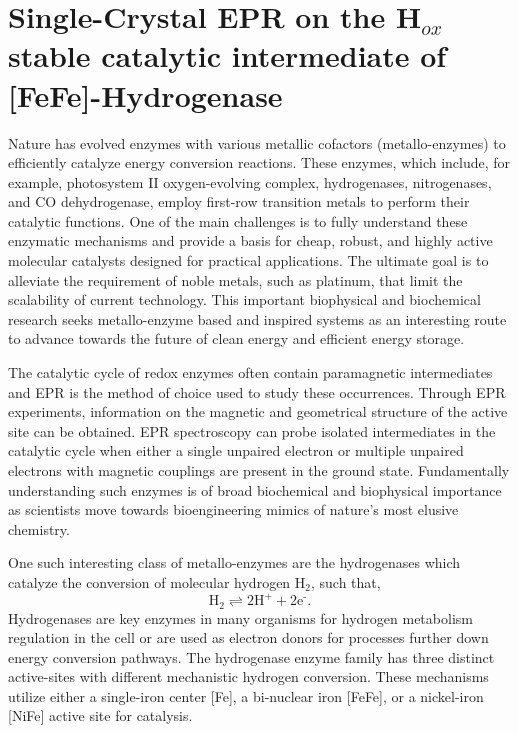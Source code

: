 \chapter[Single-Crystal EPR on FeFe-Hydrogenase]{Single-Crystal EPR on the H$_{ox}$ stable catalytic intermediate of [FeFe]-Hydrogenase}

Nature has evolved enzymes with various metallic cofactors (metallo-enzymes) to efficiently catalyze energy conversion reactions. These enzymes, which include, for example, photosystem II oxygen-evolving complex\cite{CoxOEC}, hydrogenases\cite{lubitzhyd}, nitrogenases\cite{Hoffman2014rev}, and CO dehydrogenase\cite{C5CS00182J}, employ first-row transition metals to perform their catalytic functions. One of the main challenges is to fully understand these enzymatic mechanisms and provide a basis for cheap, robust, and highly active molecular catalysts designed for practical applications. \cite{Lewis15729} The ultimate goal is to alleviate the requirement of noble metals, such as platinum, that limit the scalability of current technology. This important biophysical and biochemical research seeks metallo-enzyme based and inspired systems as an interesting route to advance towards the future of clean energy and efficient energy storage. \cite{schlogl2012chemical}

The catalytic cycle of redox enzymes often contain paramagnetic intermediates and EPR is the method of choice used to study these occurrences. Through EPR experiments, information on the magnetic and geometrical structure of the active site can be obtained. EPR spectroscopy can probe isolated intermediates in the catalytic cycle when either a single unpaired electron or multiple unpaired electrons with magnetic couplings are present in the ground state. Fundamentally understanding such enzymes is of broad biochemical and biophysical importance as scientists move towards bioengineering mimics of nature’s most elusive chemistry. \cite{WATANABE20171}

One such interesting class of metallo-enzymes are the hydrogenases\cite{lubitzhyd} which catalyze the conversion of molecular hydrogen H$_2$, such that,
\begin{equation}
    \text{H}_2 \rightleftharpoons 2 \text{H}^+ + 2\text{e}^{\text{-}}.
\end{equation}
Hydrogenases are key enzymes in many organisms for hydrogen metabolism regulation in the cell or are used as electron donors for processes further down energy conversion pathways. The hydrogenase enzyme family has three distinct active-sites with different mechanistic hydrogen conversion. These mechanisms utilize either a single-iron center [Fe], a bi-nuclear iron [FeFe], or a nickel-iron [NiFe] active site for catalysis.

